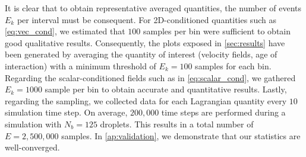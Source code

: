 It is clear that to obtain representative averaged quantities, the number of events $E_k$ per interval must be consequent. 
For 2D-conditioned quantities such as \ref{eq:vec_cond}, we estimated that $100$ samples per bin were sufficient to obtain good qualitative results. 
Consequently, the plots exposed in \ref{sec:results} have been generated by averaging the quantity of interest (velocity fields, age of interaction) with a minimum threshold of $E_k = 100$ samples for each bin.
Regarding the scalar-conditioned fields such as in \ref{eq:scalar_cond}, we gathered $E_k = 1000$ sample per bin to obtain accurate and quantitative results. 
Lastly, regarding the sampling, we collected data for each Lagrangian quantity every $10$ simulation time step.
On average, $200,000$ time steps are performed during a simulation with $N_b = 125$ droplets. 
This results in a total number of $E = 2,500,000$ samples. 
In \ref{ap:validation}, we demonstrate that our statistics are well-converged.

